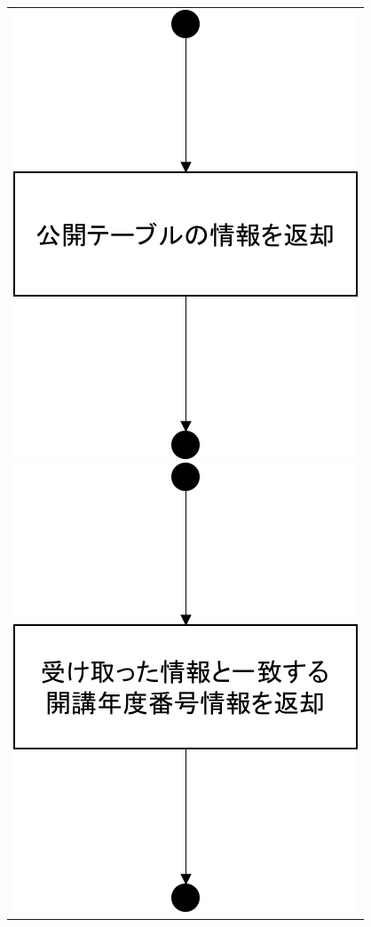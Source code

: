 \begin{figure}[htbp]
  \begin{tabular}{c}
 \begin{minipage}{0.33\hsize}
  \begin{center}
   \includegraphics[width=0.8\linewidth,clip]{./img/flow/14.png}
  \end{center}
 \end{minipage}
 \begin{minipage}{0.33\hsize}
  \begin{center}
   \includegraphics[width=0.8\linewidth,clip]{./img/flow/15.png}

\end{center}
\end{minipage}
\end{tabular}
\end{figure}
